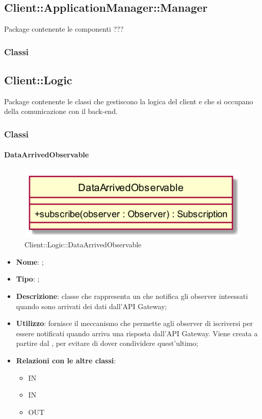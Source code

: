 \subsection{Client::ApplicationManager::Manager}
Package contenente le componenti ???
\subsubsection{Classi}
\subsection{Client::Logic}
Package contenente le classi che gestiscono la logica del client e che si occupano della comunicazione con il back-end.
\subsubsection{Classi}
\hypertarget{DataArrivedObservable_label}{\paragraph{DataArrivedObservable}}
\begin{figure}[h]
	\centering
	\includegraphics[width=\textwidth,height=\textheight,keepaspectratio]{images/ClassDataArrivedObservable.png}
	\caption{Client::Logic::DataArrivedObservable}
\end{figure}
\begin{itemize}
	\item \textbf{Nome}: ;
	\item \textbf{Tipo}: ;
	\item \textbf{Descrizione}: classe che rappresenta un  che notifica gli observer inteessati quando sono arrivati dei dati dall'API Gateway;
	\item \textbf{Utilizzo}: fornisce il meccanismo che permette agli observer di iscriversi per essere notificati quando arriva una risposta dall'API Gateway. Viene creata a partire dal , per evitare di dover condividere quest'ultimo;
	\item \textbf{Relazioni con le altre classi}:
	\begin{itemize}
		\item IN \hyperlink{ApplicationManagerObserver_label}{}
		\item IN \hyperlink{PlayerObserver_label}{}
		\item OUT \hyperlink{DataArrivedSubject_label}{}
	\end{itemize}
\end{itemize}

